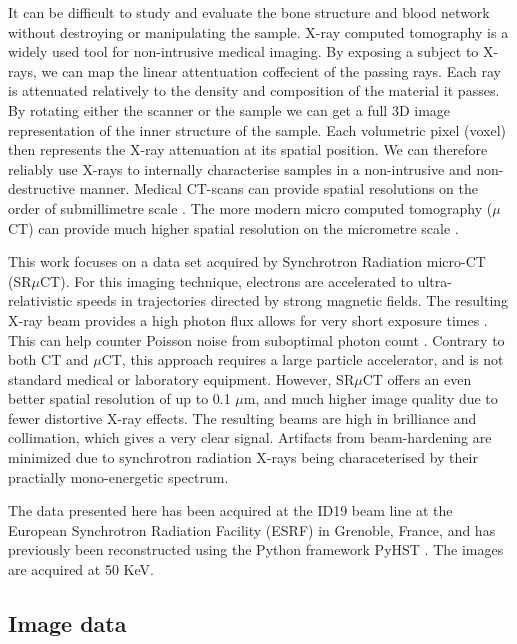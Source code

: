It can be difficult to study and evaluate the bone structure and blood network without destroying
or manipulating the sample. X-ray computed tomography is a widely used tool for non-intrusive medical
imaging. By exposing a subject to X-rays, we can map the linear attentuation coffecient of the passing
rays. Each ray is attenuated relatively to the density and composition of the material it passes.
By rotating either the scanner or the sample we can get a full 3D image representation of the inner
structure of the sample. Each volumetric pixel (voxel) then represents the X-ray attenuation at its
spatial position. We can therefore reliably use X-rays to internally characterise samples in a
non-intrusive and non-destructive manner. Medical CT-scans can provide spatial resolutions on the
order of submillimetre scale \citep{medicalct}. The more modern micro computed tomography ($\mu$CT)
can provide much higher spatial resolution on the micrometre scale \citep{srexptime}.

This work focuses on a data set acquired by Synchrotron Radiation micro-CT (SR$\mu$CT). For this imaging
technique, electrons are accelerated to ultra-relativistic speeds in trajectories directed by strong
magnetic fields. The resulting X-ray beam provides a high photon flux allows for very short exposure
times \citep{srexptime}. This can help counter Poisson noise from suboptimal photon count \citep{srnoise}.
Contrary to both CT and $\mu$CT, this approach requires a large particle accelerator,
and is not standard medical or laboratory equipment. However, SR$\mu$CT 
offers an even better spatial resolution of up to 0.1 $\mu$m, and much higher image quality due to
fewer distortive X-ray effects.
The resulting beams are high in
brilliance and collimation, which gives a very clear signal. Artifacts from beam-hardening are
minimized due to synchrotron radiation X-rays being characeterised by their practially mono-energetic
spectrum.

The data presented here has been acquired at the ID19 beam line at the European Synchrotron
Radiation Facility (ESRF) in Grenoble, France, and has previously \citep{sporring} been
reconstructed using the Python framework PyHST \citep{pyhst}. The images are acquired at 50 KeV.

\subsection{Image data}

